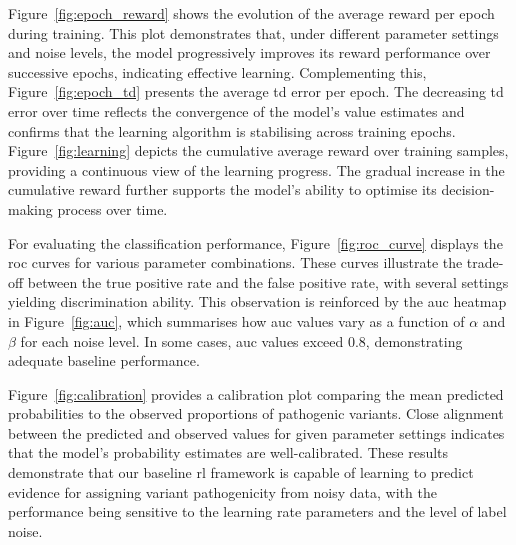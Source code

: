 Figure~\ref{fig:epoch_reward} shows the evolution of the average reward per epoch during training. This plot demonstrates that, under different parameter settings and noise levels, the model progressively improves its reward performance over successive epochs, indicating effective learning.
Complementing this, Figure~\ref{fig:epoch_td} presents the average \ac{td} error per epoch. The decreasing \ac{td} error over time reflects the convergence of the model’s value estimates and confirms that the learning algorithm is stabilising across training epochs.
Figure~\ref{fig:learning} depicts the cumulative average reward over training samples, providing a continuous view of the learning progress. The gradual increase in the cumulative reward further supports the model's ability to optimise its decision-making process over time.

For evaluating the classification performance, Figure~\ref{fig:roc_curve} displays the \ac{roc} curves for various parameter combinations. These curves illustrate the trade-off between the true positive rate and the false positive rate, with several settings yielding discrimination ability. This observation is reinforced by the \ac{auc} heatmap in Figure~\ref{fig:auc}, which summarises how \ac{auc} values vary as a function of $\alpha$ and $\beta$ for each noise level. In some cases, \ac{auc} values exceed 0.8, demonstrating adequate baseline performance.

Figure~\ref{fig:calibration} provides a calibration plot comparing the mean predicted probabilities to the observed proportions of pathogenic variants. Close alignment between the predicted and observed values for given parameter settings indicates that the model’s probability estimates are well-calibrated.
These results demonstrate that our baseline \ac{rl} framework is capable of learning to predict evidence for assigning variant pathogenicity from noisy data, with the performance being sensitive to the learning rate parameters and the level of label noise.

